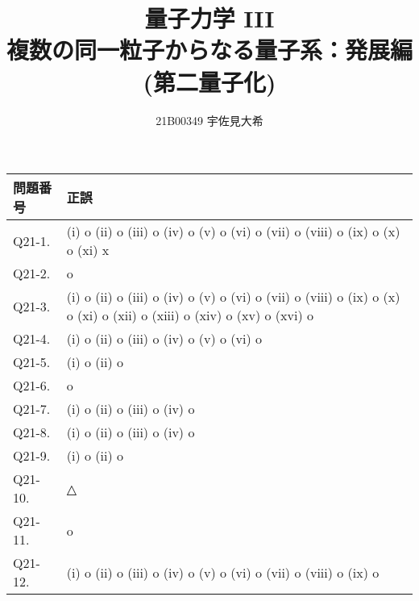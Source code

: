 \documentclass[uplatex,dvipdfmx,a4paper,11pt]{jlreq}
\title{量子力学 III \\ 複数の同一粒子からなる量子系：発展編 (第二量子化)}
\author{21B00349 宇佐見大希}
\numberwithin{equation}{section}
\theoremstyle{definition}
\begin{document}
\maketitle
\tableofcontents
\clearpage

\begin{table}[hbtp]
  \label{table:data_type}
  \centering
  \begin{tabular}{ll}
    \hline
    問題番号    & 正誤                                                                                                                    \\
    \hline \hline
    Q21-1.  & (i) o (ii) o (iii) o (iv) o (v) o (vi) o (vii) o (viii) o (ix) o (x) o (xi) x                                         \\
    Q21-2.  & o                                                                                                                     \\
    Q21-3.  & (i) o (ii) o (iii) o (iv) o (v) o (vi) o (vii) o (viii) o (ix) o (x) o (xi) o (xii) o (xiii) o (xiv) o (xv) o (xvi) o \\
    Q21-4.  & (i) o (ii) o (iii) o (iv) o (v) o (vi) o                                                                              \\
    Q21-5.  & (i) o (ii) o                                                                                                          \\
    Q21-6.  & o                                                                                                                     \\
    Q21-7.  & (i) o (ii) o (iii) o (iv) o                                                                                           \\
    Q21-8.  & (i) o (ii) o (iii) o (iv) o                                                                                           \\
    Q21-9.  & (i) o (ii) o                                                                                                          \\
    Q21-10. & △                                                                                                                     \\
    Q21-11. & o                                                                                                                     \\
    Q21-12. & (i) o (ii) o (iii) o (iv) o (v) o (vi) o (vii) o (viii) o (ix) o                                                      \\

\end{tabular}
\end{table}
\end{document}
